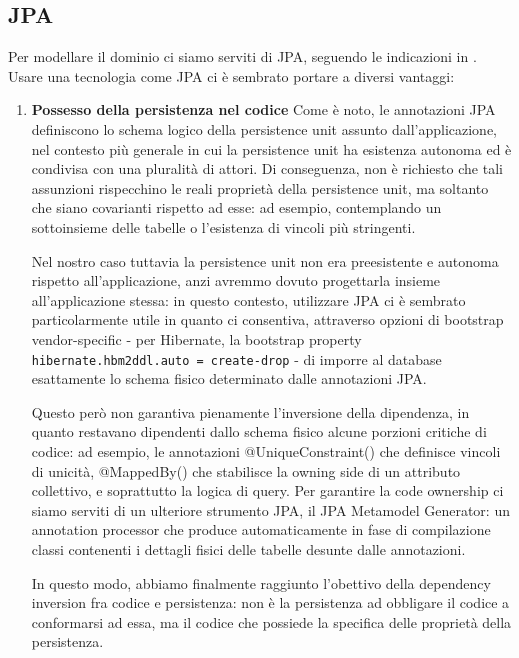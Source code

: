 \subsection{JPA}
Per modellare il dominio ci siamo serviti di JPA, seguendo le indicazioni in \cite{panda2014ejb3}. 
Usare una tecnologia come JPA ci è sembrato portare a diversi vantaggi:
\begin{enumerate}
    \item \textbf{Possesso della persistenza nel codice} \newline
          Come è noto, le annotazioni JPA definiscono lo schema logico della persistence unit
          assunto dall'applicazione, nel contesto più generale in cui la persistence unit ha
          esistenza autonoma ed è condivisa con una pluralità di attori.
          Di conseguenza, non è richiesto che tali assunzioni rispecchino le reali proprietà
          della persistence unit, ma soltanto che siano covarianti rispetto ad esse:
          ad esempio, contemplando un sottoinsieme delle tabelle o l'esistenza di vincoli più stringenti.

          Nel nostro caso tuttavia la persistence unit non era preesistente e autonoma
          rispetto all'applicazione, anzi avremmo dovuto progettarla insieme all'applicazione stessa:
          in questo contesto, utilizzare JPA ci è sembrato particolarmente utile in quanto ci consentiva,
          attraverso opzioni di bootstrap vendor-specific - per Hibernate, la bootstrap property
          \texttt{hibernate.hbm2ddl.auto = create-drop} - di imporre al database esattamente
          lo schema fisico determinato dalle annotazioni JPA.

          Questo però non garantiva pienamente l'inversione della dipendenza, in quanto
          restavano dipendenti dallo schema fisico alcune porzioni critiche di codice: ad esempio,
          le annotazioni @UniqueConstraint() che definisce vincoli di unicità, @MappedBy() che stabilisce
          la owning side di un attributo collettivo, e soprattutto la logica di query.
          Per garantire la code ownership ci siamo serviti di un ulteriore strumento JPA,
          il JPA Metamodel Generator: un annotation processor che produce automaticamente
          in fase di compilazione classi contenenti i dettagli fisici delle tabelle desunte
          dalle annotazioni.

          In questo modo, abbiamo finalmente raggiunto l'obettivo della dependency inversion
          fra codice e persistenza: non è la persistenza ad obbligare il codice a conformarsi
          ad essa, ma il codice che possiede la specifica delle proprietà della persistenza.


\end{enumerate}
